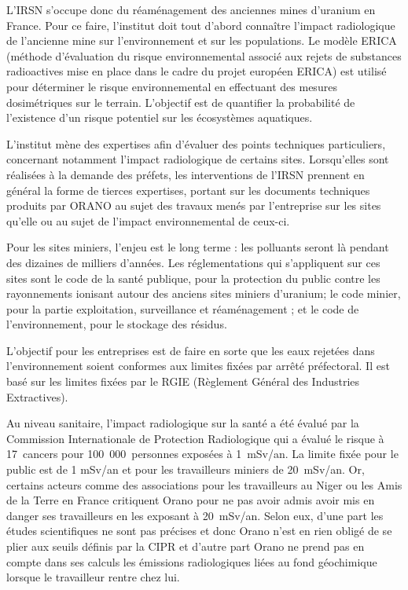 \documentclass{article}
\begin{document}
L’IRSN s’occupe donc  du réaménagement des anciennes mines d’uranium en France. Pour ce faire, l’institut doit tout d’abord connaître l’impact radiologique de l’ancienne mine sur l’environnement et sur les populations. Le modèle ERICA (méthode d’évaluation du risque environnemental associé aux rejets de substances radioactives mise en place dans le cadre du projet européen ERICA) est utilisé pour déterminer  le risque environnemental en effectuant des mesures dosimétriques sur le terrain. L’objectif est de quantifier la probabilité de l’existence d’un risque potentiel sur les écosystèmes aquatiques.

L’institut  mène  des  expertises  afin  d’évaluer  des  points  techniques  particuliers,  concernant notamment l’impact radiologique de certains sites. Lorsqu’elles sont réalisées à la demande des préfets, les interventions de l’IRSN prennent en général la forme de tierces expertises, portant sur les documents techniques produits par ORANO au sujet des travaux menés par l'entreprise sur les sites qu'elle ou au sujet de l’impact environnemental de ceux-ci.

Pour les sites miniers, l’enjeu est le long terme : les polluants seront là pendant des dizaines de milliers d’années. Les réglementations qui s’appliquent sur ces sites sont le code de la santé publique, pour la protection du public contre les rayonnements ionisant autour des anciens sites miniers d’uranium; le code minier, pour la partie exploitation, surveillance et réaménagement ; et le code de l’environnement, pour le stockage des résidus.

L’objectif pour les entreprises est de faire en sorte que les eaux rejetées dans l’environnement soient conformes aux limites fixées par arrêté préfectoral. Il est  basé sur les limites fixées par le RGIE (Règlement Général des Industries Extractives).

Au niveau sanitaire, l’impact radiologique sur la santé a été évalué par la Commission Internationale de Protection Radiologique qui a évalué le risque à 17~cancers pour 100~000~personnes exposées à 1~mSv/an. La limite fixée pour le public est de 1 mSv/an et pour les travailleurs miniers de 20~mSv/an. Or, certains acteurs comme des associations pour les travailleurs au Niger ou les Amis de la Terre en France critiquent Orano pour ne pas avoir admis avoir mis en danger ses travailleurs en les exposant à 20~mSv/an. Selon eux, d’une part les études scientifiques ne sont pas précises et donc Orano n’est en rien obligé de se plier aux seuils définis par la CIPR et d’autre part Orano ne prend pas en compte dans ses calculs les émissions radiologiques liées au fond géochimique lorsque le travailleur rentre chez lui.
\end{document}
